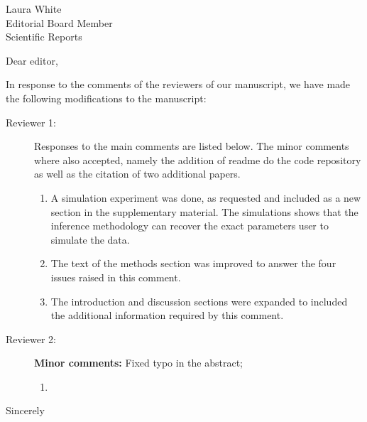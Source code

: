 \documentclass[a4paper,10pt]{letter}
\begin{document}

\begin{letter}{Laura White\\Editorial Board Member\\Scientific Reports }
\address{Escola de Matem\'atica Aplicada\\Funda\c{c}\~ao Getulio Vargas 
(FGV)\\Rio de Janeiro -- RJ\\Brazil.}

\opening{Dear editor,}

In response to the comments of the reviewers of our manuscript, we have made 
the following modifications to the manuscript:

\begin{description}
 \item[Reviewer 1:] Responses to the main comments are listed below. The minor 
comments where also accepted, namely the addition of readme do the code 
repository as well as the citation of two  additional papers. 
 
 \begin{enumerate}
  \item A simulation experiment was done, as requested and included as a new 
section in the supplementary material. The simulations shows that the inference 
methodology can recover the exact parameters user to simulate  the data.
\item The text of the methods section was improved to answer the four issues 
raised in this comment.
\item The introduction and discussion sections were expanded to included the 
additional information required by this comment.
 \end{enumerate}

 \item [Reviewer 2:] \textbf{Minor comments:} Fixed typo in the abstract; 
 \begin{enumerate}
  \item 
 \end{enumerate}

\end{description}



\signature{Flávio Codeço Coelho\\Professor}

\closing{Sincerely}


\end{letter}
\end{document}
